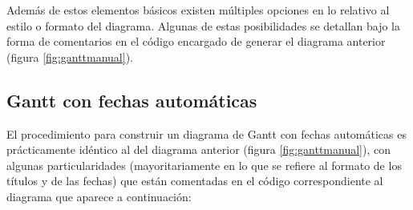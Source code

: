 \documentclass[a4paper, 11pt, spanish, twoside]{article}
\begin{document}
Además de estos elementos básicos existen múltiples opciones en lo relativo al estilo o formato del diagrama. Algunas de estas posibilidades se detallan bajo la forma de comentarios en el código encargado de generar el diagrama anterior (figura \ref{fig:ganttmanual}).


\subsection{Gantt con fechas automáticas}

El procedimiento para construir un diagrama de Gantt con fechas automáticas es prácticamente idéntico al del diagrama anterior (figura \ref{fig:ganttmanual}), con algunas particularidades (mayoritariamente en lo que se refiere al formato de los títulos y de las fechas) que están comentadas en el código correspondiente al diagrama que aparece a continuación:
\end{document}
